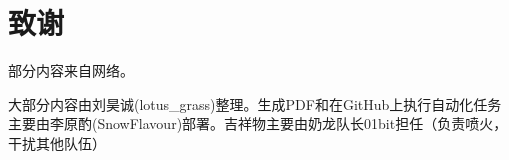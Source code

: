 \section{致谢}
部分内容来自网络。

大部分内容由刘昊诚(lotus\_grass)整理。生成PDF和在GitHub上执行自动化任务主要由李原酌(SnowFlavour)部署。吉祥物主要由奶龙队长01bit担任（负责喷火，干扰其他队伍）